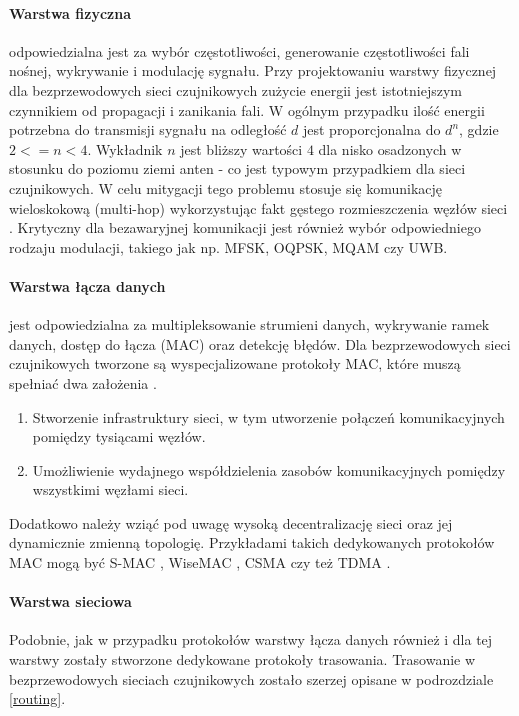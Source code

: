 \paragraph{Warstwa fizyczna}
odpowiedzialna jest za wybór częstotliwości, generowanie częstotliwości fali nośnej, wykrywanie i modulację sygnału. Przy projektowaniu warstwy fizycznej dla bezprzewodowych sieci czujnikowych zużycie energii jest istotniejszym czynnikiem od propagacji i zanikania fali. W ogólnym przypadku ilość energii potrzebna do transmisji sygnału na odległość $d$ jest proporcjonalna do $d^{n}$, gdzie $2 <= n < 4$. Wykładnik $n$ jest bliższy wartości $4$ dla nisko osadzonych w stosunku do poziomu ziemi anten \cite{Sohrabi1999} - co jest typowym przypadkiem dla sieci czujnikowych. W celu mitygacji tego problemu stosuje się komunikację wieloskokową (multi-hop) wykorzystując fakt gęstego rozmieszczenia węzłów sieci \cite{Akyildiz2002.09}.
Krytyczny dla bezawaryjnej komunikacji jest również wybór odpowiedniego rodzaju modulacji, takiego jak np. MFSK, OQPSK, MQAM czy UWB.

\paragraph{Warstwa łącza danych}
jest odpowiedzialna za multipleksowanie strumieni danych, wykrywanie ramek danych, dostęp do łącza (MAC) oraz detekcję błędów. Dla bezprzewodowych sieci czujnikowych tworzone są wyspecjalizowane protokoły MAC, które muszą spełniać dwa założenia \cite{Akyildiz2002.09, Demirkol2006}.
\begin{enumerate}
\item Stworzenie infrastruktury sieci, w tym utworzenie połączeń komunikacyjnych pomiędzy tysiącami węzłów.
\item Umożliwienie wydajnego współdzielenia zasobów komunikacyjnych pomiędzy wszystkimi węzłami sieci.
\end{enumerate}
Dodatkowo należy wziąć pod uwagę wysoką decentralizację sieci oraz jej dynamicznie zmienną topologię. Przykładami takich dedykowanych protokołów MAC mogą być S-MAC \cite{Ye2002}, WiseMAC \cite{Hoiydi2004}, CSMA \cite{Althobaiti2015} czy też TDMA \cite{Althobaiti2015}.

\paragraph{Warstwa sieciowa}
Podobnie, jak w przypadku protokołów warstwy łącza danych również i dla tej warstwy zostały stworzone dedykowane protokoły trasowania. Trasowanie w bezprzewodowych sieciach czujnikowych zostało szerzej opisane w podrozdziale \ref{routing}.

